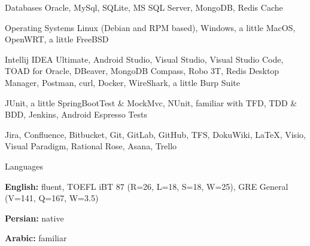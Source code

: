 \begin{cvskills}
\cvskill
  {Databases} %
  {Oracle, MySql, SQLite, MS SQL Server, MongoDB, Redis Cache} %
  
\cvskill
  {Operating Systems} %
  {Linux (Debian and RPM based), Windows, a little MacOS, OpenWRT, a little FreeBSD} %
  
\cvskill
  {} %
  {Intellij IDEA Ultimate, Android Studio, Visual Studio, Visual Studio Code, TOAD for Oracle, DBeaver, MongoDB Compass, Robo 3T, Redis Desktop Manager, Postman, curl, Docker, WireShark, a little Burp Suite} %
  
\cvskill
  {} %
  {JUnit, a little SpringBootTest \& MockMvc, NUnit, familiar with TFD, TDD \& BDD, Jenkins, Android Espresso Tests} %
  
\cvskill
  {} %
  {Jira, Confluence, Bitbucket, Git, GitLab, GitHub, TFS, DokuWiki, LaTeX, Visio, Visual Paradigm, Rational Rose, Asana, Trello} %

\cvskill
  {Languages} %
  { %
    \begin{cvitems} %
      \item {\textbf{English:} fluent, TOEFL iBT 87 (R=26, L=18, S=18, W=25), GRE General (V=141, Q=167, W=3.5)}
      \item {\textbf{Persian:} native}
      \item {\textbf{Arabic:} familiar}
    \end{cvitems}
  }
  
\end{cvskills}
